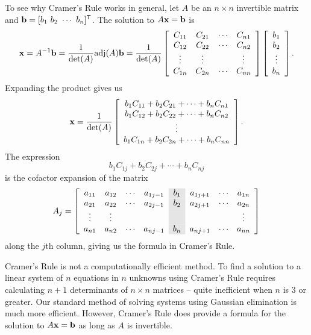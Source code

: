 To see why Cramer's Rule works in general, let $A$ be an $n \times n$ invertible matrix and $\vb = [b_1 \ b_2 \ \cdots \ b_n]^{\tr}$. The solution to $A \mathbf{x} = \mathbf{b}$ is 
\[\mathbf{x} = A^{-1} \mathbf{b} = \frac{1}{\det(A)} \text{adj}(A) \mathbf{b} = \frac{1}{\det(A)}\left[ \begin{array}{cccc}
C_{11} 	& C_{21} &\cdots & C_{n1} \\
C_{12} 	& C_{22} &\cdots & C_{n2} \\
\vdots 	&  \vdots  &			 & \vdots \\
C_{1n} 	& C_{2n} &\cdots & C_{nn} 
\end{array} \right] \left[ \begin{array}{c} b_1 \\ b_2 \\ \vdots \\ b_n \end{array} \right].\]
Expanding the product gives us
\[\mathbf{x} = \frac{1}{\det(A)}\left[ \begin{array}{c} b_1C_{11} + b_2C_{21} + \cdots + b_nC_{n1}  \\ b_1C_{12} + b_2C_{22} + \cdots + b_nC_{n2}   \\ \vdots \\ b_1C_{1n} + b_2C_{2n} + \cdots + b_nC_{nn}   \end{array} \right].\]
The expression 
\[b_1C_{1j} + b_2C_{2j} + \cdots + b_nC_{nj}\]
is the cofactor expansion of the matrix 
\[A_j = \left[ \begin{array}{cccc>{\columncolor{Gray}}cccc}
a_{11} 	& a_{12} & \cdots    &a_{1j-1} &b_1 	&a_{1j+1}		&\cdots 	& a_{1n} \\
a_{21} 	& a_{22} & \cdots    &a_{2j-1} &b_2 	&a_{2j+1}	&\cdots	& a_{2n} \\
\vdots 	&  \vdots  & 		    &           	&		&				&		 	& \vdots \\
a_{n1} 	& a_{n2} & \cdots    &a_{nj-1} &b_n 	&a_{nj+1}	&\cdots	& a_{nn} 
\end{array} \right]\]
along the $j$th column, giving us the formula in Cramer's Rule. 

Cramer's Rule is not a computationally efficient method. To find a solution to a linear system of $n$ equations in $n$ unknowns using Cramer's Rule requires calculating $n+1$ determinants of $n \times n$ matrices -- quite inefficient when $n$ is 3 or greater. Our standard method of solving systems using Gaussian elimination is much more efficient. However, Cramer's Rule does provide a formula for the solution to $A \mathbf{x} = \mathbf{b}$ as long as $A$ is invertible. 

